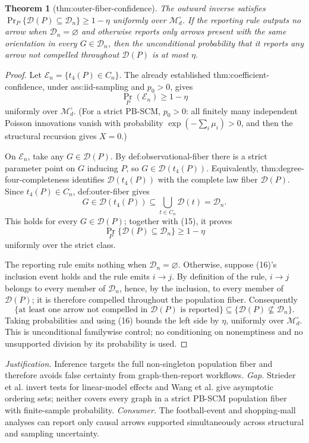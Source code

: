 \documentclass{article}
\newtheorem{theorem}{Theorem}
\begin{document}
\begin{theorem}[thm:outer-fiber-confidence]\label{thm:outer-fiber-confidence}
The outward inverse satisfies \(\Pr_P\{\mathcal D(P)\subseteq\mathcal D_n\}\ge1-\eta\) uniformly over \(\mathcal M_d^\circ\). If the reporting rule outputs no arrow when \(\mathcal D_n=\varnothing\) and otherwise reports only arrows present with the same orientation in every \(G\in\mathcal D_n\), then the unconditional probability that it reports any arrow not compelled throughout \(\mathcal D(P)\) is at most \(\eta\).
\end{theorem}
\begin{proof}
Let \(\mathcal E_n=\{t_4(P)\in C_n\}\).  The already established thm:coefficient-confidence, under ass:iid-sampling and \(p_0>0\), gives
\[
 \Pr_P(\mathcal E_n)\ge1-\eta
\tag{15}
\]
uniformly over \(\mathcal M_d^\circ\).  (For a strict PB-SCM, \(p_0>0\): all finitely many independent Poisson innovations vanish with probability \(\exp(-\sum_i\mu_i)>0\), and then the structural recursion gives \(X=0\).)

On \(\mathcal E_n\), take any \(G\in\mathcal D(P)\).  By def:observational-fiber there is a strict parameter point on \(G\) inducing \(P\), so \(G\in\mathcal D(t_4(P))\).  Equivalently, thm:degree-four-completeness identifies \(\mathcal D(t_4(P))\) with the complete law fiber \(\mathcal D(P)\).  Since \(t_4(P)\in C_n\), def:outer-fiber gives
\[
 G\in\mathcal D(t_4(P))
 \subseteq\bigcup_{t\in C_n}\mathcal D(t)=\mathcal D_n.
\]
This holds for every \(G\in\mathcal D(P)\); together with (15), it proves
\[
 \Pr_P\{\mathcal D(P)\subseteq\mathcal D_n\}\ge1-\eta
\tag{16}
\]
uniformly over the strict class.

The reporting rule emits nothing when \(\mathcal D_n=\varnothing\).  Otherwise, suppose (16)'s inclusion event holds and the rule emits \(i\to j\).  By definition of the rule, \(i\to j\) belongs to every member of \(\mathcal D_n\), hence, by the inclusion, to every member of \(\mathcal D(P)\); it is therefore compelled throughout the population fiber.  Consequently
\[
 \{\text{at least one arrow not compelled in }\mathcal D(P)\text{ is reported}\}
 \subseteq
 \{\mathcal D(P)\nsubseteq\mathcal D_n\}.
\]
Taking probabilities and using (16) bounds the left side by \(\eta\), uniformly over \(\mathcal M_d^\circ\).  This is unconditional familywise control; no conditioning on nonemptiness and no unsupported division by its probability is used.
\end{proof}
\par\smallskip\noindent \textit{Justification.} Inference targets the full non-singleton population fiber and therefore avoids false certainty from graph-then-report workflows. \textit{Gap.} Strieder et al. invert tests for linear-model effects and Wang et al. give asymptotic ordering sets; neither covers every graph in a strict PB-SCM population fiber with finite-sample probability. \textit{Consumer.} The football-event and shopping-mall analyses can report only causal arrows supported simultaneously across structural and sampling uncertainty.
\end{document}
